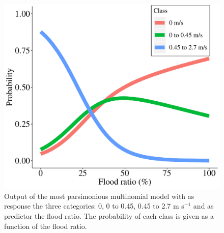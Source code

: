 \documentclass[preprint,12pt,authoryear]{elsarticle}
\begin{document}
\begin{figure}[h!]
  \centering\includegraphics[scale=0.7]{multinomial}
  \caption{Output of the most parsimonious multinomial model with as response the three categories: 0, 0 to 0.45, 0.45 to 2.7 m s$^{-1}$ and as predictor the flood ratio. The probability of each class is given as a function of the flood ratio.}
  \label{fig:multinomial}
\end{figure}
\end{document}
